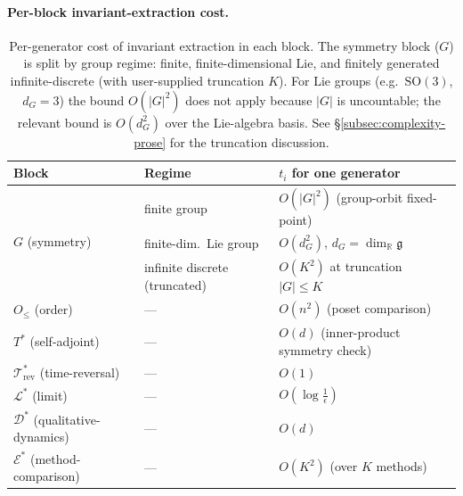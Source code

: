 \documentclass[manuscript]{acmart}
\begin{document}
\paragraph{Per-block invariant-extraction cost.}
\begin{table}[h]
\centering
\caption{Per-generator cost of invariant extraction in each block. The symmetry block ($G$) is split by group regime: finite, finite-dimensional Lie, and finitely generated infinite-discrete (with user-supplied truncation $K$). For Lie groups (e.g.\ $\mathrm{SO}(3)$, $d_G=3$) the bound $O(|G|^2)$ does not apply because $|G|$ is uncountable; the relevant bound is $O(d_G^2)$ over the Lie-algebra basis. See \S\ref{subsec:complexity-prose} for the truncation discussion.}
\label{tab:complexity}
\small
\begin{tabular}{lll}
\toprule
\textbf{Block} & \textbf{Regime} & \textbf{$t_i$ for one generator} \\
\midrule
\multirow{3}{*}{$G$ (symmetry)}
  & finite group & $O(|G|^2)$ (group-orbit fixed-point) \\
  & finite-dim.\ Lie group & $O(d_G^2)$, $d_G = \dim_{\mathbb{R}} \mathfrak{g}$ \\
  & infinite discrete (truncated) & $O(K^2)$ at truncation $|G|\le K$ \\
\midrule
$O_{\le}$ (order) & --- & $O(n^2)$ (poset comparison) \\
$T^{*}$ (self-adjoint) & --- & $O(d)$ (inner-product symmetry check) \\
$\mathcal{T}^{*}_{\mathrm{rev}}$ (time-reversal) & --- & $O(1)$ \\
$\mathcal{L}^{*}$ (limit) & --- & $O(\log\!\frac{1}{\epsilon})$ \\
$\mathcal{D}^{*}$ (qualitative-dynamics) & --- & $O(d)$ \\
$\mathcal{E}^{*}$ (method-comparison) & --- & $O(K^2)$ (over $K$ methods) \\
\bottomrule
\end{tabular}
\end{table}
\end{document}
